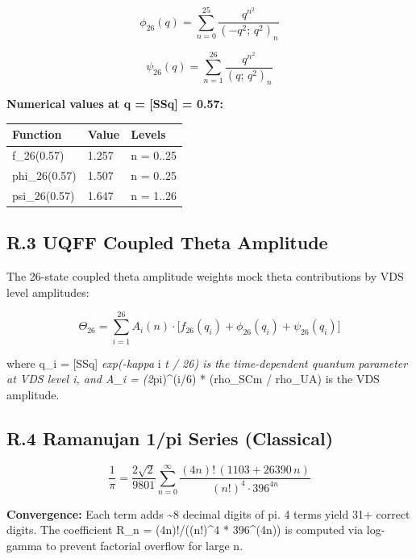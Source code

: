 \documentclass[12pt,a4paper]{article}
\begin{document}
\begin{equation}
\phi_{26}(q) = \sum_{n=0}^{25} \frac{q^{n^2}}{(-q^2;\,q^2)_n}
\end{equation}

\begin{equation}
\psi_{26}(q) = \sum_{n=1}^{26} \frac{q^{n^2}}{(q;\,q^2)_n}
\end{equation}

\textbf{Numerical values at q = [SSq] = 0.57:}

\begin{center}
\begin{longtable}{@{}lll@{}}
\toprule
Function & Value & Levels \tabularnewline
\midrule
\endhead
f\_26(0.57) & 1.257 & n = 0..25 \tabularnewline
phi\_26(0.57) & 1.507 & n = 0..25 \tabularnewline
psi\_26(0.57) & 1.647 & n = 1..26 \tabularnewline
\bottomrule
\end{longtable}
\end{center}

\subsection{R.3 UQFF Coupled Theta Amplitude}

The 26-state coupled theta amplitude weights mock theta contributions by VDS level amplitudes:

\begin{equation}
\Theta_{26} = \sum_{i=1}^{26} A_i(n) \cdot \bigl[f_{26}(q_i) + \phi_{26}(q_i) + \psi_{26}(q_i)\bigr]
\end{equation}

where q\_i = [SSq] \emph{ exp(-kappa } i \emph{ t / 26) is the time-dependent quantum parameter at VDS level i, and A\_i = (2}pi)\^{}(i/6) * (rho\_SCm / rho\_UA) is the VDS amplitude.

\subsection{R.4 Ramanujan 1/pi Series (Classical)}

\begin{equation}
\frac{1}{\pi} = \frac{2\sqrt{2}}{9801} \sum_{n=0}^{\infty} \frac{(4n)!\,(1103 + 26390\,n)}{(n!)^4 \cdot 396^{4n}}
\end{equation}

\textbf{Convergence:} Each term adds \textasciitilde{}8 decimal digits of pi. 4 terms yield 31+ correct digits. The coefficient R\_n = (4n)!/((n!)\^{}4 * 396\^{}(4n)) is computed via log-gamma to prevent factorial overflow for large n.
\end{document}

